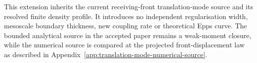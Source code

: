 This extension inherits the current receiving-front translation-mode source
and its resolved finite density profile.  It introduces no independent
regularisation width, mesoscale boundary thickness, new coupling rate or
theoretical Epps curve.  The bounded analytical source in the accepted paper
remains a weak-moment closure, while the numerical source is compared at the
projected front-displacement law as described in
Appendix~\ref{app:translation-mode-numerical-source}.
